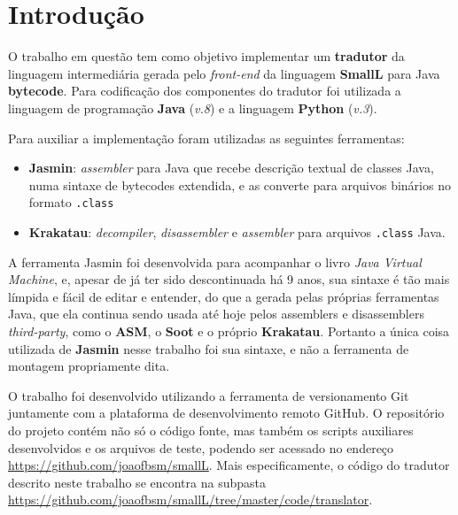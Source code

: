 \section{Introdução}

O trabalho em questão tem como objetivo implementar um \textbf{tradutor} da linguagem intermediária gerada pelo \textit{front-end} da linguagem \textbf{SmallL} para Java \textbf{bytecode}. Para codificação dos componentes do tradutor foi utilizada a linguagem de programação \textbf{Java} (\textit{v.8}) e a linguagem \textbf{Python} (\textit{v.3}). 

Para auxiliar a implementação foram utilizadas as seguintes ferramentas:

\begin{itemize}
\item \textbf{Jasmin}: \textit{assembler} para Java que recebe descrição textual de classes Java, numa sintaxe de bytecodes extendida, e as converte para arquivos binários no formato \texttt{.class}
\item \textbf{Krakatau}: \textit{decompiler}, \textit{disassembler} e \textit{assembler} para arquivos \texttt{.class} Java.
\end{itemize}

A ferramenta Jasmin foi desenvolvida para acompanhar o livro \textit{Java Virtual Machine}\cite{trove.nla.gov.au/work/14968069}, e, apesar de já ter sido descontinuada há 9 anos, sua sintaxe é tão mais límpida e fácil de editar e entender, do que a gerada pelas próprias ferramentas Java, que ela continua sendo usada até hoje pelos assemblers e disassemblers \textit{third-party}, como o \textbf{ASM}, o \textbf{Soot} e o próprio \textbf{Krakatau}. Portanto a única coisa utilizada de \textbf{Jasmin} nesse trabalho foi sua sintaxe, e não a ferramenta de montagem propriamente dita.

O trabalho foi desenvolvido utilizando a ferramenta de versionamento Git juntamente com a plataforma de desenvolvimento remoto GitHub. O repositório do projeto contém não só o código fonte, mas também os scripts auxiliares desenvolvidos e os arquivos de teste, podendo ser acessado no endereço \url{https://github.com/joaofbsm/smallL}. Mais especificamente, o código do tradutor descrito neste trabalho se encontra na subpasta \url{https://github.com/joaofbsm/smallL/tree/master/code/translator}.

